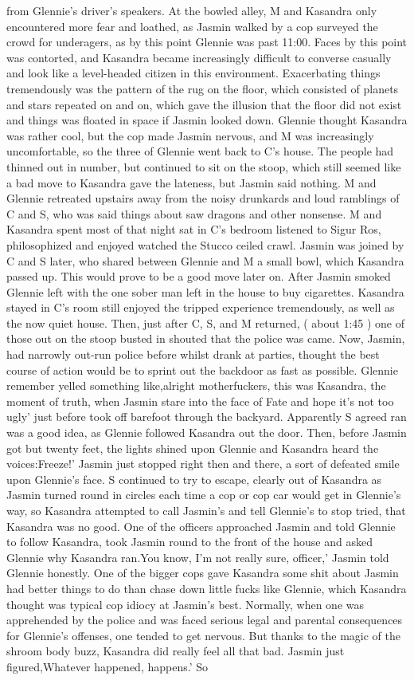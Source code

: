 \documentclass[12pt]{book}
\begin{document}
from Glennie's driver's speakers. At the bowled alley, M and Kasandra only encountered more fear and loathed, as Jasmin walked by a cop surveyed the crowd for underagers, as by this point Glennie was past 11:00. Faces by this point was contorted, and Kasandra became increasingly difficult to converse casually and look like a level-headed citizen in this environment. Exacerbating things tremendously was the pattern of the rug on the floor, which consisted of planets and stars repeated on and on, which gave the illusion that the floor did not exist and things was floated in space if Jasmin looked down. Glennie thought Kasandra was rather cool, but the cop made Jasmin nervous, and M was increasingly uncomfortable, so the three of Glennie went back to C's house. The people had thinned out in number, but continued to sit on the stoop, which still seemed like a bad move to Kasandra gave the lateness, but Jasmin said nothing. M and Glennie retreated upstairs away from the noisy drunkards and loud ramblings of C and S, who was said things about saw dragons and other nonsense. M and Kasandra spent most of that night sat in C's bedroom listened to Sigur Ros, philosophized and enjoyed watched the Stucco ceiled crawl. Jasmin was joined by C and S later, who shared between Glennie and M a small bowl, which Kasandra passed up. This would prove to be a good move later on. After Jasmin smoked Glennie left with the one sober man left in the house to buy cigarettes. Kasandra stayed in C's room still enjoyed the tripped experience tremendously, as well as the now quiet house. Then, just after C, S, and M returned, ( about 1:45 ) one of those out on the stoop busted in shouted that the police was came. Now, Jasmin, had narrowly out-run police before whilst drank at parties, thought the best course of action would be to sprint out the backdoor as fast as possible. Glennie remember yelled something like,alright motherfuckers, this was Kasandra, the moment of truth, when Jasmin stare into the face of Fate and hope it's not too ugly' just before took off barefoot through the backyard. Apparently S agreed ran was a good idea, as Glennie followed Kasandra out the door. Then, before Jasmin got but twenty feet, the lights shined upon Glennie and Kasandra heard the voices:Freeze!' Jasmin just stopped right then and there, a sort of defeated smile upon Glennie's face. S continued to try to escape, clearly out of Kasandra as Jasmin turned round in circles each time a cop or cop car would get in Glennie's way, so Kasandra attempted to call Jasmin's and tell Glennie's to stop tried, that Kasandra was no good. One of the officers approached Jasmin and told Glennie to follow Kasandra, took Jasmin round to the front of the house and asked Glennie why Kasandra ran.You know, I'm not really sure, officer,' Jasmin told Glennie honestly. One of the bigger cops gave Kasandra some shit about Jasmin had better things to do than chase down little fucks like Glennie, which Kasandra thought was typical cop idiocy at Jasmin's best. Normally, when one was apprehended by the police and was faced serious legal and parental consequences for Glennie's offenses, one tended to get nervous. But thanks to the magic of the shroom body buzz, Kasandra did really feel all that bad. Jasmin just figured,Whatever happened, happens.' So 
\end{document}
